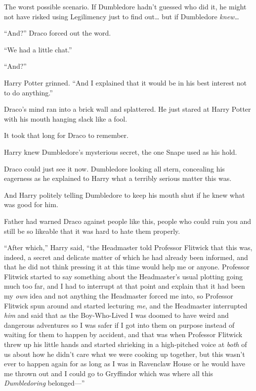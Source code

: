 The worst possible scenario. If Dumbledore hadn't guessed who did it, he
might not have risked using Legilimency just to find out\ldots{} but if
Dumbledore \emph{knew\ldots{}}

``And?'' Draco forced out the word.

``We had a little chat.''

``And?''

Harry Potter grinned. ``And I explained that it would be in his best
interest not to do anything.''

Draco's mind ran into a brick wall and splattered. He just stared at
Harry Potter with his mouth hanging slack like a fool.

It took that long for Draco to remember.

Harry knew Dumbledore's mysterious secret, the one Snape used as his
hold.

Draco could just see it now. Dumbledore looking all stern, concealing
his eagerness as he explained to Harry what a terribly serious matter
this was.

And Harry politely telling Dumbledore to keep his mouth shut if he knew
what was good for him.

Father had warned Draco against people like this, people who could ruin
you and still be so likeable that it was hard to hate them properly.

``After which,'' Harry said, ``the Headmaster told Professor Flitwick
that this was, indeed, a secret and delicate matter of which he had
already been informed, and that he did not think pressing it at this
time would help me or anyone. Professor Flitwick started to say
something about the Headmaster's usual plotting going much too far, and
I had to interrupt at that point and explain that it had been my
\emph{own} idea and not anything the Headmaster forced me into, so
Professor Flitwick spun around and started lecturing \emph{me}, and the
Headmaster interrupted \emph{him} and said that as the Boy-Who-Lived I
was doomed to have weird and dangerous adventures so I was safer if I
got into them on purpose instead of waiting for them to happen by
accident, and that was when Professor Flitwick threw up his little hands
and started shrieking in a high-pitched voice at \emph{both} of us about
how he didn't care what we were cooking up together, but this wasn't
ever to happen again for as long as I was in Ravenclaw House or he would
have me thrown out and I could go to Gryffindor which was where all this
\emph{Dumbledoring} belonged---''

